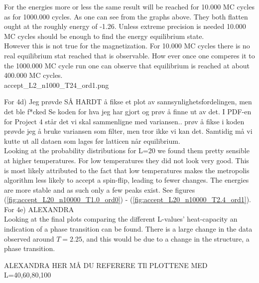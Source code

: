 \documentclass{article}
\begin{document}
For the energies more or less the same result will be reached for 10.000 MC cycles as for 1000.000 cycles. As one can see from the graphs above. They both flatten ought at the roughly energy of -1.26. Unless extreme precision is needed 10.000 MC cycles should be enough to find the energy equilibrium state. \\

However this is not true for the magnetization. For 10.000 MC cycles there is no real equilibrium stat reached that is observable. How ever once one comperes it to the 1000.000 MC cycle run one can observe that equilibrium is reached at about 400.000 MC cycles. \\


accept\_L2\_n1000\_T24\_ord1.png



For 4d) Jeg prøvde SÅ HARDT å fikse et plot av sannsynlighetsfordelingen, men det ble f*cked
Se koden for hva jeg har gjort og prøv å finne ut av det.
I PDF-en for Project 4 står det vi skal sammenligne med variansen.. prøv å fikse
i koden prøvde jeg å bruke variansen som filter, men tror ikke vi kan det. Samtidig må vi kutte ut all dataen som lages før latticen når equilibrium. \\

Looking at the probability distributions for L=20 we found them pretty sensible at higher temperatures. For low temperatures they did not look very good. This is most likely attributed to the fact that low temperatures makes the metropolis algorithm less likely to accept a spin-flip, leading to fewer changes. The energies are more stable and as such only a few peaks exist. See figures (\ref{fig:accept_L20_n10000_T1.0_ord0}) - (\ref{fig:accept_L20_n10000_T2.4_ord1}). \\




For 4e) ALEXANDRA \\

Looking at the final plots comparing the different L-values' heat-capacity an indication of a phase transition can be found. There is a large change in the data observed around $T=2.25$, and this would be due to a change in the structure, a phase transition. \\

{\Huge ALEXANDRA HER MÅ DU REFERERE TIl PLOTTENE MED L=40,60,80,100 \par}
\end{document}
